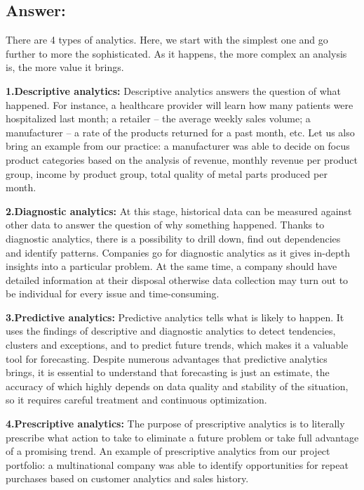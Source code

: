 \documentclass[10 pm]{article}
\begin{document}
\subsection*{Answer:}

There are 4 types of analytics. Here, we start with the simplest one and go further to more the sophisticated. As it happens, the more complex an analysis is, the more value it brings.

\textbf{1.Descriptive analytics:} Descriptive analytics answers the question of what happened. For instance, a healthcare provider will learn how many patients were hospitalized last month; a retailer – the average weekly sales volume; a manufacturer – a rate of the products returned for a past month, etc. Let us also bring an example from our practice: a manufacturer was able to decide on focus product categories based on the analysis of revenue, monthly revenue per product group, income by product group, total quality of metal parts produced per month.


\textbf{2.Diagnostic analytics:} At this stage, historical data can be measured against other data to answer the question of why something happened. Thanks to diagnostic analytics, there is a possibility to drill down, find out dependencies and identify patterns. Companies go for diagnostic analytics as it gives in-depth insights into a particular problem. At the same time, a company should have detailed information at their disposal otherwise data collection may turn out to be individual for every issue and time-consuming.


\textbf{3.Predictive analytics:} Predictive analytics tells what is likely to happen. It uses the findings of descriptive and diagnostic analytics to detect tendencies, clusters and exceptions, and to predict future trends, which makes it a valuable tool for forecasting. Despite numerous advantages that predictive analytics brings, it is essential to understand that forecasting is just an estimate, the accuracy of which highly depends on data quality and stability of the situation, so it requires careful treatment and continuous optimization.

\textbf{4.Prescriptive analytics:} The purpose of prescriptive analytics is to literally prescribe what action to take to eliminate a future problem or take full advantage of a promising trend. An example of prescriptive analytics from our project portfolio: a multinational company was able to identify opportunities for repeat purchases based on customer analytics and sales history.
\end{document}
